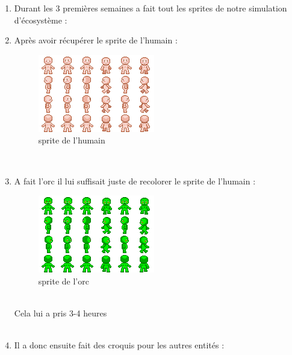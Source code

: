 \documentclass[a4paper, 11pt]{article}
\begin{document}
\begin{enumerate}
\item Durant les 3 premières semaines a fait tout les sprites de notre simulation d'écosystème :\\
\item Après avoir récupérer le sprite de l'humain :
\\
\begin{figure}[ht!]
 \centering
 \includegraphics[width=0.5\linewidth]{images/human.png}
 \caption{sprite de l'humain}
 \label{fig::example::one}
\end{figure} 
\\
\item A fait l'orc il lui suffisait juste de recolorer le sprite de l'humain :
\\ 
\begin{figure}[ht!]
 \centering
 \includegraphics[width=0.5\linewidth]{images/orc.png}
 \caption{sprite de l'orc}
 \label{fig::example::one}
\end{figure}
\\
Cela lui a pris 3-4 heures\\
\\
\item Il a donc ensuite fait des croquis pour les autres entités :
\\
\begin{figure}[ht!]
  \begin{minipage}[c]{.5\linewidth}
   \centering

\end{minipage}
\end{figure}
\end{enumerate}
\end{document}
